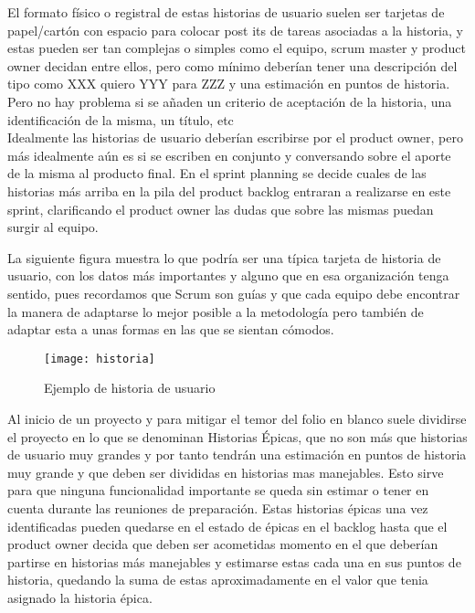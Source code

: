 \documentclass[../pfc.tex]{subfiles}
\begin{document}
	El formato físico o registral de estas historias de usuario suelen ser tarjetas de papel/cartón con espacio para colocar post its de tareas asociadas a la historia, y estas pueden ser tan complejas o simples como el equipo, scrum master y product owner decidan entre ellos, pero como mínimo deberían tener una descripción del tipo como XXX quiero YYY para ZZZ y una estimación en puntos de historia. Pero no hay problema si se añaden un criterio de aceptación de la historia, una identificación de la misma, un título, etc\\
	
	Idealmente las historias de usuario deberían escribirse por el product owner, pero más idealmente aún es si se escriben en conjunto y conversando sobre el aporte de la misma al producto final. En el sprint planning se decide cuales de las historias más arriba en la pila del product backlog entraran a realizarse en este sprint, clarificando el product owner las dudas que sobre las mismas puedan surgir al equipo.
	
	La siguiente figura muestra lo que podría ser una típica tarjeta de historia de usuario, con los datos más importantes y alguno que en esa organización tenga sentido, pues recordamos que Scrum son guías y que cada equipo debe encontrar la manera de adaptarse lo mejor posible a la metodología pero también de adaptar esta a unas formas en las que se sientan cómodos. \\ 
	
	\begin{figure}[h]
		\centering
		\texttt{[image: historia]}
		\caption{Ejemplo de historia de usuario}
		\label{fig:ejemplo de historia de usuario}
	\end{figure}
	
	Al inicio de un proyecto y para mitigar el temor del folio en blanco suele dividirse el proyecto en lo que se denominan Historias Épicas, que no son más que historias de usuario muy grandes y por tanto tendrán una estimación en puntos de historia muy grande y que deben ser divididas en historias mas manejables. Esto sirve para que ninguna funcionalidad importante se queda sin estimar o tener en cuenta durante las reuniones de preparación. Estas historias épicas una vez identificadas pueden quedarse en el estado de épicas en el backlog hasta que el product owner decida que deben ser acometidas momento en el que deberían partirse en historias más manejables y estimarse estas cada una en sus puntos de historia, quedando la suma de estas aproximadamente en el valor que tenia asignado la historia épica. 
	
\end{document}
